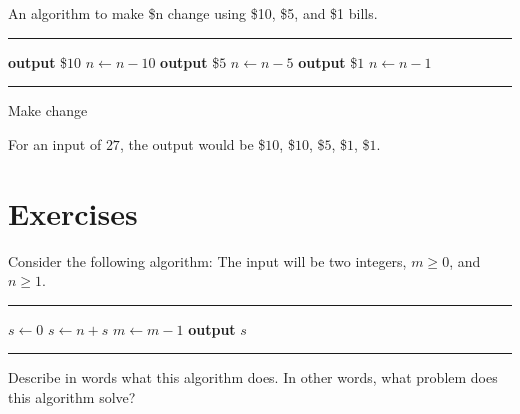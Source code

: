 \clearpage
\begin{exmp}
An algorithm to make \$n change using \$10, \$5, and \$1 bills.
\begin{algrthm}
  \hrule\kern5pt\relax
  \begin{algorithmic}[1]
        \State \textbf{output} \$$10$
        \State $n \gets n-10$
      \EndWhile
        \State \textbf{output} \$$5$
        \State $n \gets n-5$
      \EndWhile
        \State \textbf{output} \$$1$
        \State $n \gets n-1$
      \EndWhile
  \end{algorithmic}
  \hrule\kern5pt\relax
  \caption{Make change}
\end{algrthm}

%
%
%
\noindent
For an input of $27$, the output would be \quad\$$10$, \$$10$, \$$5$, \$$1$, \$$1$.
\end{exmp}

\clearpage
\section{Exercises}

\begin{exer}
Consider the following algorithm: The input will be two 
integers, $m\geq 0$, and $n\geq 1$.
\begin{algrthm}
  \hrule\kern5pt\relax
  \begin{algorithmic}
    \State $s \gets 0$
      \State $s \gets n+s$
      \State $m \gets m-1$
    \EndWhile
    \State \textbf{output} $s$
  \end{algorithmic}
  \hrule\kern5pt\relax
\end{algrthm}
%
%
%
%

Describe in words what this algorithm does. In other words,
what problem does this algorithm solve?
\end{exer}

